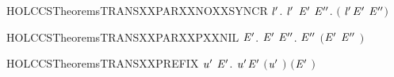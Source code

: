 \begin{SaveVerbatim}{HOLCCSTheoremsTRANSXXPARXXNOXXSYNCR}
\HOLTokenTurnstile{} \HOLSymConst{\HOLTokenForall{}} \ensuremath{\HOLBoundVar{l}\sp{\prime}}.
        \HOLSymConst{\HOLTokenNotEqual{}}  \ensuremath{\HOLBoundVar{l}\sp{\prime}} \HOLSymConst{\HOLTokenImp{}}
       \HOLSymConst{\HOLTokenForall{}} \ensuremath{\HOLBoundVar{E}\sp{\prime}} \ensuremath{\HOLBoundVar{E}\sp{\prime\prime}}. \HOLSymConst{\HOLTokenNeg{}}\ensuremath{(} \HOLSymConst{\ensuremath{\ldotp}} \HOLSymConst{\ensuremath{\mid}}  \ensuremath{\HOLBoundVar{l}\sp{\prime}}\HOLSymConst{\ensuremath{\ldotp}}\ensuremath{\HOLBoundVar{E}\sp{\prime}} \HOLTokenTransBegin\HOLConst{\ensuremath{\tau}}\HOLTokenTransEnd \ensuremath{\HOLBoundVar{E}\sp{\prime\prime}}\ensuremath{)}
\end{SaveVerbatim}
\newcommand{\HOLCCSTheoremsTRANSXXPARXXNOXXSYNCR}{\UseVerbatim{HOLCCSTheoremsTRANSXXPARXXNOXXSYNCR}}
\begin{SaveVerbatim}{HOLCCSTheoremsTRANSXXPARXXPXXNIL}
\HOLTokenTurnstile{} \HOLSymConst{\HOLTokenForall{}}  \ensuremath{\HOLBoundVar{E}\sp{\prime}}.  \HOLSymConst{\ensuremath{\mid}}  \HOLTokenTransBegin{}\HOLTokenTransEnd \ensuremath{\HOLBoundVar{E}\sp{\prime}} \HOLSymConst{\HOLTokenImp{}} \HOLSymConst{\HOLTokenExists{}}\ensuremath{\HOLBoundVar{E}\sp{\prime\prime}}.  \HOLTokenTransBegin{}\HOLTokenTransEnd \ensuremath{\HOLBoundVar{E}\sp{\prime\prime}} \HOLSymConst{\HOLTokenConj{}} \ensuremath{(}\ensuremath{\HOLBoundVar{E}\sp{\prime}} \HOLSymConst{\ensuremath{=}} \ensuremath{\HOLBoundVar{E}\sp{\prime\prime}} \HOLSymConst{\ensuremath{\mid}} \ensuremath{)}
\end{SaveVerbatim}
\newcommand{\HOLCCSTheoremsTRANSXXPARXXPXXNIL}{\UseVerbatim{HOLCCSTheoremsTRANSXXPARXXPXXNIL}}
\begin{SaveVerbatim}{HOLCCSTheoremsTRANSXXPREFIX}
\HOLTokenTurnstile{} \HOLSymConst{\HOLTokenForall{}}  \ensuremath{\HOLBoundVar{u}\sp{\prime}} \ensuremath{\HOLBoundVar{E}\sp{\prime}}. \HOLSymConst{\ensuremath{\ldotp}} \HOLTokenTransBegin\ensuremath{\HOLBoundVar{u}\sp{\prime}}\HOLTokenTransEnd \ensuremath{\HOLBoundVar{E}\sp{\prime}} \HOLSymConst{\HOLTokenImp{}} \ensuremath{(}\ensuremath{\HOLBoundVar{u}\sp{\prime}} \HOLSymConst{\ensuremath{=}} \ensuremath{)} \HOLSymConst{\HOLTokenConj{}} \ensuremath{(}\ensuremath{\HOLBoundVar{E}\sp{\prime}} \HOLSymConst{\ensuremath{=}} \ensuremath{)}
\end{SaveVerbatim}
